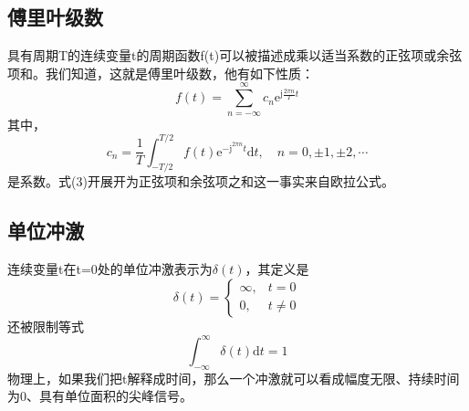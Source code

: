 \documentclass[UTF8,a4paper]{ctexart}
\begin{document}
\subsection{傅里叶级数}
具有周期T的连续变量t的周期函数f(t)可以被描述成乘以适当系数的正弦项或余弦项和。我们知道，这就是傅里叶级数，他有如下性质：
\begin{equation}
f(t)=\sum_{n=-\infty}^{\infty} c_{n} \mathrm{e}^{\mathrm{j} \frac{2 \pi n}{T} t}
\end{equation}
其中，
\begin{equation}
c_{n}=\frac{1}{T} \int_{-T / 2}^{T / 2} f(t) \mathrm{e}^{-\mathrm{j}^{2 \pi n} t} \mathrm{d} t, \quad n=0,\pm 1,\pm 2, \cdots
\end{equation}
是系数。式(3)开展开为正弦项和余弦项之和这一事实来自欧拉公式。
\subsection{单位冲激}
连续变量t在t=0处的单位冲激表示为$\delta(t)$，其定义是
\begin{equation}
\delta(t)=\left\{\begin{array}{ll}
\infty, & t=0 \\
0, & t \neq 0
\end{array}\right.\end{equation}
还被限制等式
\begin{equation}
\int_{-\infty}^{\infty} \delta(t) \mathrm{d} t=1
\end{equation}
物理上，如果我们把t解释成时间，那么一个冲激就可以看成幅度无限、持续时间为0、具有单位面积的尖峰信号。
\end{document}
